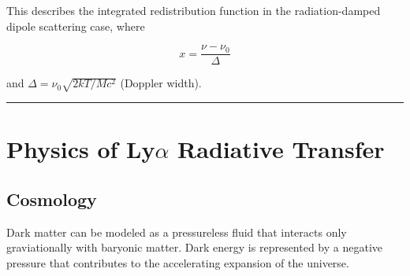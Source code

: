 \documentclass[onecolumn]{aastex63}
\begin{document}
This describes the integrated redistribution function in the radiation-damped dipole scattering case, where 

\begin{equation}
    x = \frac{\nu - \nu_0}{\Delta}
\end{equation}

and $\Delta = \nu_0 \sqrt{2kT/Mc^2}$ (Doppler width).




\vspace{1cm}
\hrule
\vspace{1cm}

\section{Physics of Ly$\alpha$ Radiative Transfer}
\begin{centering}

\cite{dijkstra2017}

\end{centering}



\subsection{Cosmology}

Dark matter can be modeled as a pressureless fluid that interacts only graviationally with baryonic matter. Dark energy is represented by a negative pressure that contributes to the accelerating expansion of the universe.
\end{document}
